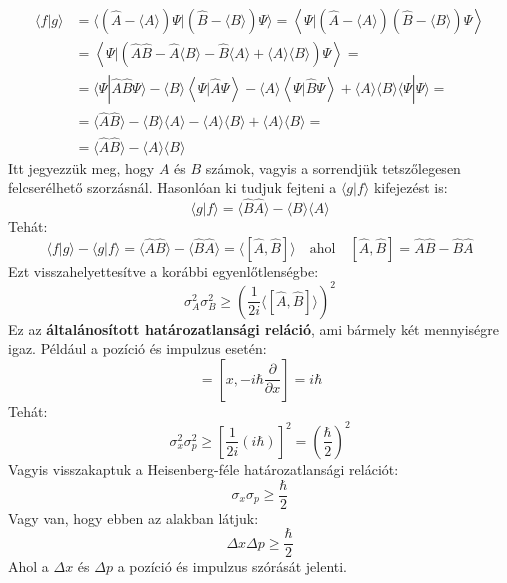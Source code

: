 \documentclass[../main.tex]{subfiles}
\begin{document}
\begin{equation}
    \begin{aligned}
        \langle f | g \rangle &= \langle (\hat{A} - \langle A \rangle) \Psi | (\hat{B} - \langle B \rangle) \Psi \rangle = \left\langle \Psi | \left(\hat{A} - \langle A \rangle \right) \left(\hat{B} - \langle B \rangle \right) \Psi \right\rangle \\
        &= \left\langle \Psi | \left( \hat{A} \hat{B} - \hat{A} \langle B \rangle - \hat{B} \langle A \rangle + \langle A \rangle \langle B \rangle \right) \Psi \right\rangle = \\
        &= \langle \Psi | \hat{A} \hat{B} \Psi \rangle - \langle B \rangle \left\langle \Psi | \hat{A} \Psi \right\rangle - \langle A \rangle \left\langle \Psi | \hat{B} \Psi \right\rangle + \langle A \rangle \langle B \rangle \langle \Psi | \Psi \rangle = \\
        &= \langle \hat{A} \hat{B} \rangle - \langle B \rangle \langle A \rangle - \langle A \rangle \langle B \rangle + \langle A \rangle \langle B \rangle = \\
        &= \langle \hat{A} \hat{B} \rangle - \langle A \rangle \langle B \rangle
    \end{aligned}
\end{equation}
Itt jegyezzük meg, hogy $A$ és $B$ számok, vagyis a sorrendjük tetszőlegesen felcserélhető szorzásnál. Hasonlóan ki tudjuk fejteni a $\langle g | f \rangle$ kifejezést is:
\begin{equation}
    \langle g | f \rangle = \langle \hat{B} \hat{A} \rangle - \langle B \rangle \langle A \rangle
\end{equation}
Tehát:
\begin{equation}
    \langle f | g \rangle - \langle g | f \rangle = \langle \hat{A} \hat{B} \rangle - \langle \hat{B} \hat{A} \rangle = \langle [\hat{A}, \hat{B}] \rangle \quad \text{ahol} \quad [\hat{A}, \hat{B}] = \hat{A} \hat{B} - \hat{B} \hat{A}
\end{equation}
Ezt visszahelyettesítve a korábbi egyenlőtlenségbe:
\begin{equation}
    \sigma_A^2 \sigma_B^2 \geq \left( \frac{1}{2i} \langle [\hat{A}, \hat{B}] \rangle \right)^2
\end{equation}
Ez az \textbf{általánosított határozatlansági reláció}, ami bármely két mennyiségre igaz. Például a pozíció és impulzus esetén:
\begin{equation}
    [\hat{x}, \hat{p}] = \left[ x, -i \hbar \frac{\partial}{\partial x} \right] = i \hbar
\end{equation}
Tehát:
\begin{equation}
    \sigma_x^2 \sigma_p^2 \geq \left[ \frac{1}{2i} (i \hbar) \right]^2 = \left(\frac{\hbar}{2}\right)^2
\end{equation}
Vagyis visszakaptuk a Heisenberg-féle határozatlansági relációt:
\begin{equation}
    \sigma_x \sigma_p \geq \frac{\hbar}{2}
\end{equation}
Vagy van, hogy ebben az alakban látjuk:
\begin{equation}
    \Delta x \Delta p \geq \frac{\hbar}{2}
\end{equation}
Ahol a $\Delta x$ és $\Delta p$ a pozíció és impulzus szórását jelenti.
\end{document}
